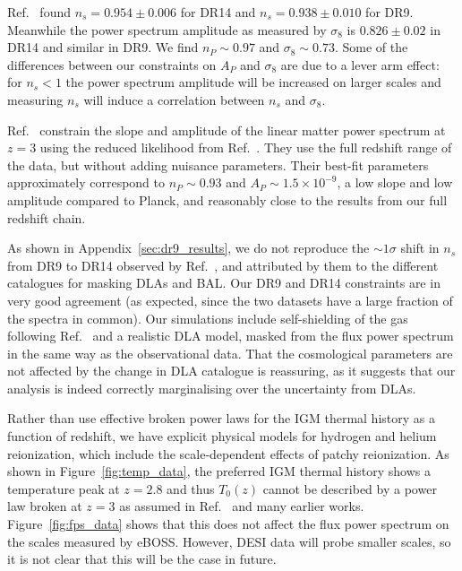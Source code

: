 Ref.~\cite{2020JCAP...04..038P} found $n_s = 0.954 \pm 0.006$ for DR14 and $n_s = 0.938 \pm 0.010$ for DR9. Meanwhile the power spectrum amplitude as measured by $\sigma_8$ is $0.826 \pm 0.02$ in DR14 and similar in DR9. We find $n_P \sim 0.97$ and $\sigma_8 \sim 0.73$. Some of the differences between our constraints on $A_P$ and $\sigma_8$ are due to a lever arm effect: for $n_s < 1$ the power spectrum amplitude will be increased on larger scales and measuring $n_s$ will induce a correlation between $n_s$ and $\sigma_8$.

Ref.~\cite{2023arXiv230300746G} constrain the slope and amplitude of the linear matter power spectrum at $z=3$ using the reduced likelihood from Ref.~\cite{2023ApJ...944..223P}. They use the full redshift range of the data, but without adding nuisance parameters. Their best-fit parameters approximately correspond to $n_P \sim 0.93$ and $A_P \sim 1.5 \times 10^{-9}$, a low slope and low amplitude compared to Planck, and reasonably close to the results from our full redshift chain.

As shown in Appendix~\ref{sec:dr9_results}, we do not reproduce the $\sim 1\sigma$ shift in $n_s$ from DR9 to DR14 observed by Ref.~\cite{2020JCAP...04..038P}, and attributed by them to the different catalogues for masking DLAs and BAL. Our DR9 and DR14 constraints are in very good agreement (as expected, since the two datasets have a large fraction of the spectra in common). Our simulations include self-shielding of the gas following Ref.~\cite{Rahmati:2013} and a realistic DLA model, masked from the flux power spectrum in the same way as the observational data. That the cosmological parameters are not affected by the change in DLA catalogue is reassuring, as it suggests that our analysis is indeed correctly marginalising over the uncertainty from DLAs.


Rather than use effective broken power laws for the IGM thermal history as a function of redshift, we have explicit physical models for hydrogen and helium reionization, which include the scale-dependent effects of patchy reionization. As shown in Figure~\ref{fig:temp_data}, the preferred IGM thermal history shows a temperature peak at $z=2.8$ and thus $T_0(z)$ cannot be described by a power law broken at $z=3$ as assumed in Ref.~\cite{2020JCAP...04..038P} and many earlier works. Figure~\ref{fig:fps_data} shows that this does not affect the flux power spectrum on the scales measured by eBOSS. However, DESI data will probe smaller scales, so it is not clear that this will be the case in future. 

